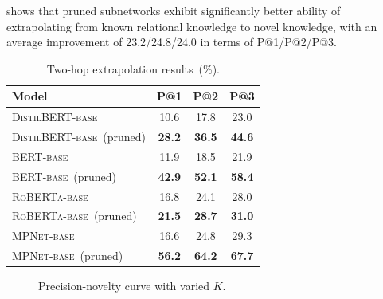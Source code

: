  shows that pruned subnetworks exhibit significantly better ability of extrapolating from known relational knowledge to novel knowledge, with an average improvement of 23.2/24.8/24.0 in terms of P@1/P@2/P@3.

\begin{table}[t!]
	\centering
	\scriptsize
	\begin{tabular}{l|ccc}
		\toprule
		\textbf{Model} &  \textbf{P@1} &  \textbf{P@2} &  \textbf{P@3}\\
		\midrule
		\textsc{DistilBERT-base} &10.6 &17.8 &23.0\\
		\textsc{DistilBERT-base}~(pruned) &\textbf{28.2}  &\textbf{36.5} &\textbf{44.6} \\
		\midrule
		\textsc{BERT-base} &11.9  &18.5 &21.9\\
		\textsc{BERT-base}~(pruned) &\textbf{42.9}  &\textbf{52.1} &\textbf{58.4} \\
		\midrule
		\textsc{RoBERTa-base} &16.8 &24.1 &28.0  \\
		\textsc{RoBERTa-base}~(pruned) &\textbf{21.5}  &\textbf{28.7} &\textbf{31.0}\\
		\midrule
		\textsc{MPNet-base} &16.6 &24.8 &29.3 \\
		\textsc{MPNet-base}~(pruned) &\textbf{56.2} &\textbf{64.2} &\textbf{67.7} \\
		\bottomrule
	\end{tabular}
	\caption{Two-hop extrapolation results~(\%).}
	\label{table:twohop}
\end{table}

\begin{figure}[t!]
	\centering
	\caption{Precision-novelty curve with varied $K$.} \label{fig:extraction}
\end{figure}


